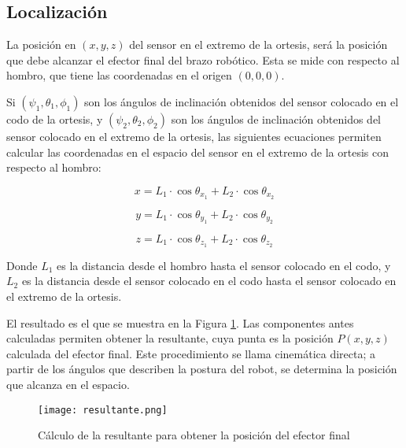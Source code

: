 \subsection{Localización}

La posición en $(x, y, z)$ del sensor en el extremo de la ortesis, será la posición que debe alcanzar el efector final del brazo robótico. Esta se mide con respecto al hombro, que tiene las coordenadas en el origen $(0, 0 ,0)$.

Si $(\psi_{1}, \theta_{1}, \phi_{1})$ son los ángulos de inclinación obtenidos del sensor colocado en el codo de la ortesis, y $(\psi_{2}, \theta_{2}, \phi_{2})$ son los ángulos de inclinación obtenidos del sensor colocado en el extremo de la ortesis, las siguientes ecuaciones permiten calcular las coordenadas en el espacio del sensor en el extremo de la ortesis con respecto al hombro:

\begin{equation}
	x = L_1 \cdot \cos \theta_{x_1} +  L_2 \cdot \cos \theta_{x_2}
	\label{eq:angulox}
\end{equation}

\begin{equation}
	y = L_1 \cdot \cos \theta_{y_1} +  L_2 \cdot \cos \theta_{y_2}
	\label{eq:angulox}
\end{equation}

\begin{equation}
	z = L_1 \cdot \cos \theta_{z_1} +  L_2 \cdot \cos \theta_{z_2}
	\label{eq:angulox}
\end{equation}

Donde $L_1$ es la distancia desde el hombro hasta el sensor colocado en el codo, y $L_2$ es la distancia desde el sensor colocado en el codo hasta el sensor colocado en el extremo de la ortesis.

El resultado es el que se muestra en la Figura \ref{fig:resultante}. Las componentes antes calculadas permiten obtener la resultante, cuya punta es la posición $P(x,y,z)$ calculada del efector final. Este procedimiento se llama cinemática directa; a partir de los ángulos que describen la postura del robot, se determina la posición que alcanza en el espacio.

\begin{figure}[htb]
	\centering
	\texttt{[image: resultante.png]}
	\caption{Cálculo de la resultante para obtener la posición del efector final}
	\label{fig:resultante}
\end{figure}